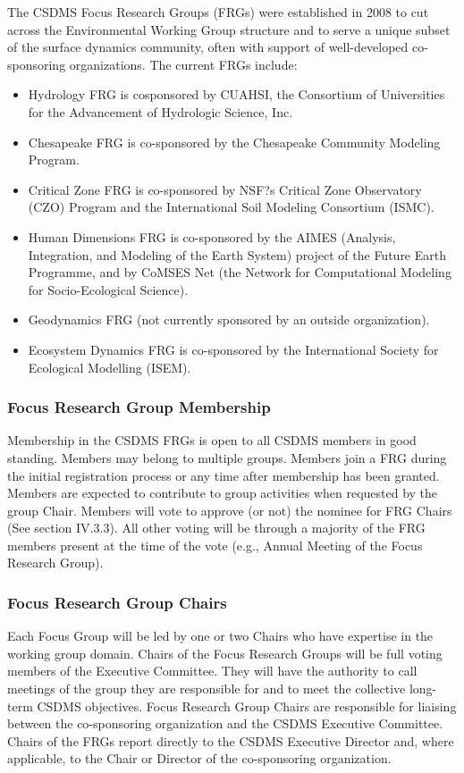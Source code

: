 \documentclass[11pt, oneside]{article}   	%
\begin{document}
The CSDMS Focus Research Groups (FRGs) were established in 2008 to cut across the Environmental Working Group structure and to serve a unique subset of the surface dynamics community, often with support of well-developed co-sponsoring organizations.  The current FRGs include:      
\begin{itemize}
\item	Hydrology FRG is cosponsored by CUAHSI, the Consortium of Universities for the Advancement of Hydrologic Science, Inc.
\item	Chesapeake FRG is co-sponsored by the Chesapeake Community Modeling Program.
\item	Critical Zone FRG is co-sponsored by NSF?s Critical Zone Observatory (CZO) Program and the International Soil Modeling Consortium (ISMC).
\item	Human Dimensions FRG is co-sponsored by the AIMES (Analysis, Integration, and Modeling of the Earth System) project of the Future Earth Programme, and by CoMSES Net (the Network for Computational Modeling for Socio-Ecological Science).
\item	Geodynamics FRG (not currently sponsored by an outside organization).
\item	Ecosystem Dynamics FRG is co-sponsored by the International Society for Ecological Modelling (ISEM). 
\end{itemize}


\subsubsection{Focus Research Group Membership}

Membership in the CSDMS FRGs is open to all CSDMS members in good standing.  Members may belong to multiple groups.  Members join a FRG during the initial registration process or any time after membership has been granted. Members are expected to contribute to group activities when requested by the group Chair. Members will vote to approve (or not) the nominee for FRG Chairs (See section IV.3.3). All other voting will be through a majority of the FRG members present at the time of the vote (e.g., Annual Meeting of the Focus Research Group). 

\subsubsection{Focus Research Group Chairs}

Each Focus Group will be led by one or two Chairs who have expertise in the working group domain. Chairs of the Focus Research Groups will be full voting members of the Executive Committee. They will have the authority to call meetings of the group they are responsible for and to meet the collective long-term CSDMS objectives. Focus Research Group Chairs are responsible for liaising between the co-sponsoring organization and the CSDMS Executive Committee.  Chairs of the FRGs report directly to the CSDMS Executive Director and, where applicable, to the Chair or Director of the co-sponsoring organization. 
\end{document}
